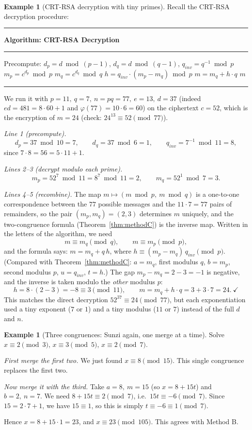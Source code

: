 \documentclass[11pt]{article}
\theoremstyle{definition}
\newtheorem{example}[theorem]{Example}
\theoremstyle{remark}
\begin{document}
\begin{example}[CRT-RSA decryption with tiny primes]\label{ex:rsa-bijection}
Recall the CRT-RSA decryption procedure:
\begin{center}
\begin{minipage}{0.95\linewidth}
\hrule\smallskip
\noindent\textbf{Algorithm: CRT-RSA Decryption}
\smallskip\hrule\smallskip
\begin{algorithmic}[1]
\State Precompute: $d_p = d \bmod (p-1)$, \quad $d_q = d \bmod (q-1)$, \quad $q_{inv} = q^{-1} \bmod p$
\State $m_p = c^{d_p} \bmod p$
\State $m_q = c^{d_q} \bmod q$
\State $h = q_{inv} \cdot (m_p - m_q) \bmod p$
\State $m = m_q + h \cdot q$
\State \Return $m$
\end{algorithmic}
\smallskip\hrule
\end{minipage}
\end{center}
We run it with $p=11,\ q=7,\ n=pq=77,\ e=13,\ d=37$ (indeed $ed=481=8\cdot60+1$ and $\varphi(77)=10\cdot6=60$) on the ciphertext $c=52$, which is the encryption of $m=24$ (check: $24^{13}\equiv52\pmod{77}$).

\emph{Line 1 (precompute).}
\[
d_p=37\bmod10=7,\qquad d_q=37\bmod6=1,\qquad q_{inv}=7^{-1}\bmod11=8,
\]
since $7\cdot8=56=5\cdot11+1$.

\emph{Lines 2--3 (decrypt modulo each prime).}
\[
m_p=52^{7}\bmod11=8^7\bmod11=2,\qquad m_q=52^{1}\bmod7=3.
\]

\emph{Lines 4--5 (recombine).} The map $m\mapsto(m\bmod p,\ m\bmod q)$ is a one-to-one correspondence between the $77$ possible messages and the $11\cdot7=77$ pairs of remainders, so the pair $(m_p,m_q)=(2,3)$ determines $m$ uniquely, and the two-congruence formula (Theorem~\ref{thm:methodC}) is the inverse map. Written in the letters of the algorithm, we need
\[
m\equiv m_q\pmod q,\qquad m\equiv m_p\pmod p,
\]
and the formula says: $m=m_q+q\,h$, where $h\equiv(m_p-m_q)\,q_{inv}\pmod p$. (Compared with Theorem~\ref{thm:methodC}: $a=m_q$, first modulus $q$, $b=m_p$, second modulus $p$, $u=q_{inv}$, $t=h$.) The gap $m_p-m_q=2-3=-1$ is negative, and the inverse is taken modulo the \emph{other} modulus $p$:
\[
h=8\cdot(2-3)=-8\equiv3\pmod{11},\qquad m=m_q+h\cdot q=3+3\cdot7=24.\ \checkmark
\]
This matches the direct decryption $52^{37}\equiv24\pmod{77}$, but each exponentiation used a tiny exponent ($7$ or $1$) and a tiny modulus ($11$ or $7$) instead of the full $d$ and $n$.
\end{example}

\begin{example}[Three congruences: Sunzi again, one merge at a time]
Solve $x\equiv2\pmod3$, $x\equiv3\pmod5$, $x\equiv2\pmod7$.

\emph{First merge the first two.} We just found $x\equiv8\pmod{15}$. This single congruence replaces the first two.

\emph{Now merge it with the third.} Take $a=8,\ m=15$ (so $x=8+15t$) and $b=2,\ n=7$. We need $8+15t\equiv2\pmod 7$, i.e.\ $15t\equiv-6\pmod7$. Since $15=2\cdot7+1$, we have $15\equiv1$, so this is simply $t\equiv-6\equiv1\pmod7$.

Hence $x=8+15\cdot1=23$, and $x\equiv23\pmod{105}$. This agrees with Method B.
\end{example}
\end{document}
